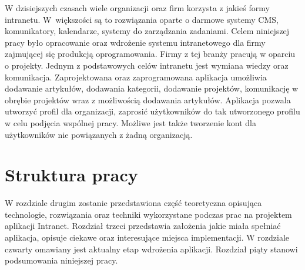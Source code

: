 W dzisiejszych czasach wiele organizacji oraz firm korzysta z jakieś formy intranetu. W~większości są to rozwiązania oparte o darmowe systemy CMS, komunikatory, kalendarze, systemy do zarządzania zadaniami. Celem niniejszej pracy było opracowanie oraz wdrożenie systemu intranetowego dla firmy zajmującej się produkcją oprogramowania. Firmy z tej branży pracują w oparciu o projekty. Jednym z podstawowych celów intranetu jest wymiana wiedzy oraz komunikacja. Zaprojektowana oraz zaprogramowana aplikacja umożliwia dodawanie artykułów, dodawania kategorii, dodawanie projektów, komunikację w obrębie projektów wraz z możliwością dodawania artykułów. Aplikacja pozwala utworzyć profil dla organizacji, zaprosić użytkowników do tak utworzonego profilu w celu podjęcia wspólnej pracy. Możliwe jest także tworzenie kont dla użytkowników nie powiązanych z żadną organizacją.

\section{Struktura pracy}
W rozdziale drugim zostanie przedstawiona część teoretyczna opisująca technologie, rozwiązania oraz techniki wykorzystane podczas prac na projektem aplikacji Intranet. Rozdział trzeci przedstawia założenia jakie miała spełniać aplikacja, opisuje ciekawe oraz interesujące miejsca implementacji. W rozdziale czwarty omawiany jest aktualny etap wdrożenia aplikacji. Rozdział piąty stanowi podsumowania niniejszej pracy.